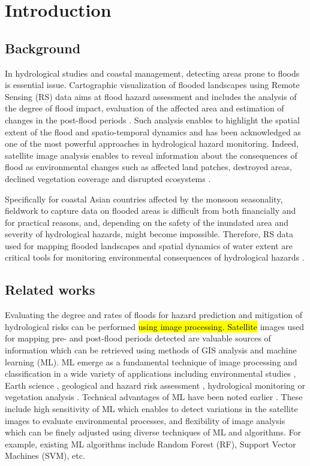 \documentclass[water,article,submit,pdftex,moreauthors]{Definitions/mdpi}
\begin{document}
\section{Introduction}

\subsection{Background}
In hydrological studies and coastal management, detecting areas prone to floods is essential issue. Cartographic visualization of flooded landscapes using Remote Sensing (RS) data aims at flood hazard assessment and includes the analysis of the degree of flood impact, evaluation of the affected area and estimation of changes in the post-flood periods \cite{su142114145,w15152802,su142316270}. Such analysis enables to highlight the spatial extent of the flood and spatio-temporal dynamics and has been acknowledged as one of the most powerful approaches in hydrological hazard monitoring. Indeed, satellite image analysis enables to reveal information about the consequences of flood as environmental changes such as affected land patches, destroyed areas, declined vegetation coverage and disrupted ecosystems \cite{ijgi12110465,rs15102561}. 

Specifically for coastal Asian countries affected by the monsoon seasonality, fieldwork to capture data on flooded areas is difficult from both financially and for practical reasons, and, depending on the safety of the inundated area and severity of hydrological hazards, might become impossible. Therefore, RS data used for mapping flooded landscapes and spatial dynamics of water extent are critical tools for monitoring environmental consequences of hydrological hazards \cite{YASEEN2024101665,GHALEHTEIMOURI2023}. 

\subsection{Related works}

Evaluating the degree and rates of floods for hazard prediction and mitigation of hydrological risks can be performed \hl{using image processing. Satellite} images used for mapping pre- and post-flood periods detected are valuable sources of information which can be retrieved using methods of GIS analysis and machine learning (ML). ML emerge as a fundamental technique of image processing and classification in a wide variety of applications including environmental studies \cite{ROCHA2022107415}, Earth science \cite{LI2023103345,Lemenkova202306,XIONG2021145256}, geological and hazard risk assessment \cite{AOURAGH2023100939}, hydrological monitoring \cite{RAFIK2023101569} or vegetation analysis \cite{WU2023110723,Lemenkova202310,DOSSANTOS2022106753}. Technical advantages of ML have been noted earlier \cite{9883389,coasts4010008}. These include high sensitivity of ML which enables to detect variations in the satellite images to evaluate environmental processes, and flexibility of image analysis which can be finely adjusted using diverse techniques of ML and algorithms. For example, existing ML algorithms include Random Forest (RF), Support Vector Machines (SVM), etc.
\end{document}
